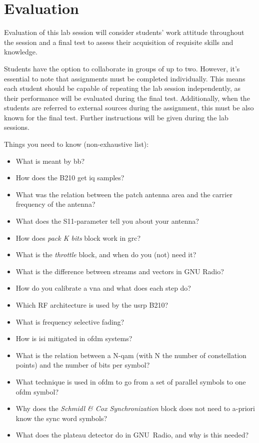 \chapter{Evaluation}\glsresetall

Evaluation of this lab session will consider students' work attitude throughout the session and a final test to assess their acquisition of requisite skills and knowledge.

Students have the option to collaborate in groups of up to two. However, it's essential to note that assignments must be completed individually. This means each student should be capable of repeating the lab session independently, as their performance will be evaluated during the final test. Additionally, when the students are referred to external sources during the assignment, this must be also known for the final test.
Further instructions will be given during the lab sessions.

Things you need to know (non-exhaustive list):
\begin{itemize}
    \item What is meant by \gls{bb}?
    \item How does the B210 get \gls{iq} samples?
    \item What was the relation between the patch antenna area and the carrier frequency of the antenna?
    \item What does the S11-parameter tell you about your antenna?
    \item How does \textit{pack K bits} block work in \gls{grc}?
    \item What is the \textit{throttle} block, and when do you (not) need it?
    \item What is the difference between streams and vectors in GNU Radio?
    \item How do you calibrate a \gls{vna} and what does each step do?
    \item Which RF architecture is used by the \gls{usrp} B210?
    \item What is frequency selective fading?
    \item How is \gls{isi} mitigated in \gls{ofdm} systems?
    \item What is the relation between a N-\gls{qam} (with N the number of constellation points) and the number of bits per symbol?
    \item What technique is used in \gls{ofdm} to go from a set of parallel symbols to one \gls{ofdm} symbol?  
    \item Why does the \textit{Schmidl \& Cox Synchronization} block does not need to a-priori know the sync word symbols?
    \item What does the plateau detector do in GNU~Radio, and why is this needed?
\end{itemize}
